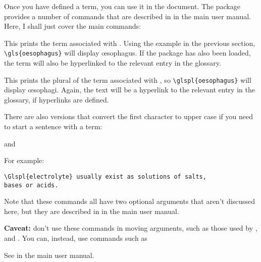 \documentclass{nlctdoc}
\begin{document}
Once you have defined a term, you can use it in the document. The
 package provides a number of commands that are
described in 
 in the main  user manual.
Here, I shall just cover the main commands:
\begin{definition}
\end{definition}
This prints the term associated with . Using the
example in the previous section, \verb|\gls{oesophagus}|
will display \oe sophagus. If the  package has also
been loaded, the term will also be hyperlinked to the relevant
entry in the glossary.
\begin{definition}
\end{definition}
This prints the plural of the term associated with ,
so \verb|\glspl{oesophagus}| will display \oe sophagi. Again, the
text will be a hyperlink to the relevant entry in the glossary, if
hyperlinks are defined.

There are also versions that convert the first character to upper
case if you need to start a sentence with a term:
\begin{definition}
\end{definition}
and
\begin{definition}
\end{definition}
For example:
\begin{verbatim}
\Glspl{electrolyte} usually exist as solutions of salts, 
bases or acids.
\end{verbatim}

Note that these commands all have two optional arguments that
aren't discussed here, but they are
described in 
in the main  user manual.

\textbf{Caveat:} don't use these commands in moving arguments, such
as those used by ,  and .
You can, instead, use commands such as
\begin{definition}
\end{definition}
See 
in the main  user manual.
\end{document}
